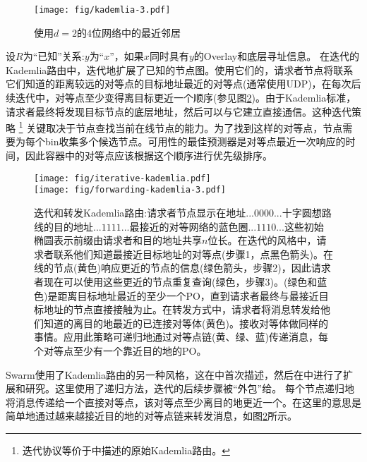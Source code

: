 \begin{figure}[htbp]
   \centering
    \texttt{[image: fig/kademlia-3.pdf]}
   \caption[最近的邻居\statusgreen]{使用$d = 2$的4位网络中的最近邻居 }
   \label{fig:bin-density}
\end{figure}

设$R$为“已知”关系:$y$为“$x$”，如果$x$同时具有$y$的Overlay和底层寻址信息。
在迭代的Kademlia路由中，迭代地扩展了已知的节点图。使用它们的，请求者节点将联系它们知道的距离较远的对等点的目标地址最近的对等点(通常使用UDP)，在每次后续迭代中，对等点至少变得离目标更近一个顺序(参见图\ref{fig:iterative-forwarding-kademlia})。由于Kademlia标准，请求者最终将发现目标节点的底层地址，然后可以与它建立直接通信。这种迭代策略%
%
\footnote{迭代协议等价于\cite{maymounkov2002kademlia}中描述的原始Kademlia路由。
}
%
关键取决于节点查找当前在线节点的能力。为了找到这样的对等点，节点需要为每个bin收集多个候选节点。可用性的最佳预测器是对等点最近一次响应的时间，因此容器中的对等点应该根据这个顺序进行优先级排序。

\begin{figure}[htbp]
   \centering
   \vspace{-2cm} 
   \texttt{[image: fig/iterative-kademlia.pdf]} \\\vspace{-1.3cm}
   \texttt{[image: fig/forwarding-kademlia-3.pdf]}
   \caption[迭代和转发Kademlia路由\statusgreen]{迭代和转发Kademlia路由:请求者节点显示在地址$...0000...$十字圆想路线的目的地址$...1111...$最接近的对等网络的蓝色圈$...1110...$这些初始椭圆表示前缀由请求者和目的地址共享$n$位长。在迭代的风格中，请求者联系他们知道最接近目标地址的对等点(步骤1，点黑色箭头)。在线的节点(黄色)响应更近的节点的信息(绿色箭头，步骤2)，因此请求者现在可以使用这些更近的节点重复查询(绿色，步骤3)。(绿色和蓝色)是距离目标地址最近的至少一个PO，直到请求者最终与最接近目标地址的节点直接接触为止。在转发方式中，请求者将消息转发给他们知道的离目的地最近的已连接对等体(黄色)。接收对等体做同样的事情。应用此策略可递归地通过对等点链(黄、绿、蓝)传递消息，每个对等点至少有一个靠近目的地的PO。}
   \label{fig:iterative-forwarding-kademlia}
\end{figure}


Swarm使用了Kademlia路由的另一种风格，这在\cite{heep2010r}中首次描述，然后在\cite{tronetal2019-network}中进行了扩展和研究。这里使用了递归方法，迭代的后续步骤被“外包”给。
每个节点递归地将消息传递给一个直接对等点，该对等点至少离目的地更近一个。在这里的意思是简单地通过越来越接近目的地的对等点链来转发消息，如图\ref{fig:iterative-forwarding-kademlia}所示。


